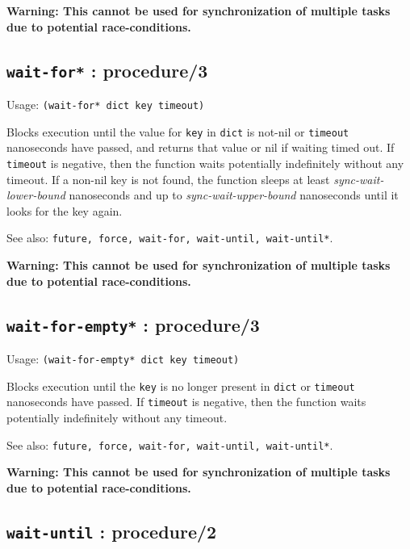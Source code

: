 \documentclass[
]{article}
\newcommand{\passthrough}[1]{#1}
\begin{document}
\textbf{Warning: This cannot be used for synchronization of multiple
tasks due to potential race-conditions.}

\hypertarget{wait-for-procedure3-1}{%
\subsection{\texorpdfstring{\texttt{wait-for*} :
procedure/3}{wait-for* : procedure/3}}\label{wait-for-procedure3-1}}

Usage: \passthrough{\lstinline!(wait-for* dict key timeout)!}

Blocks execution until the value for \passthrough{\lstinline!key!} in
\passthrough{\lstinline!dict!} is not-nil or
\passthrough{\lstinline!timeout!} nanoseconds have passed, and returns
that value or nil if waiting timed out. If
\passthrough{\lstinline!timeout!} is negative, then the function waits
potentially indefinitely without any timeout. If a non-nil key is not
found, the function sleeps at least \emph{sync-wait-lower-bound}
nanoseconds and up to \emph{sync-wait-upper-bound} nanoseconds until it
looks for the key again.

See also:
\passthrough{\lstinline!future, force, wait-for, wait-until, wait-until*!}.

\textbf{Warning: This cannot be used for synchronization of multiple
tasks due to potential race-conditions.}

\hypertarget{wait-for-empty-procedure3-1}{%
\subsection{\texorpdfstring{\texttt{wait-for-empty*} :
procedure/3}{wait-for-empty* : procedure/3}}\label{wait-for-empty-procedure3-1}}

Usage: \passthrough{\lstinline!(wait-for-empty* dict key timeout)!}

Blocks execution until the \passthrough{\lstinline!key!} is no longer
present in \passthrough{\lstinline!dict!} or
\passthrough{\lstinline!timeout!} nanoseconds have passed. If
\passthrough{\lstinline!timeout!} is negative, then the function waits
potentially indefinitely without any timeout.

See also:
\passthrough{\lstinline!future, force, wait-for, wait-until, wait-until*!}.

\textbf{Warning: This cannot be used for synchronization of multiple
tasks due to potential race-conditions.}

\hypertarget{wait-until-procedure2-1}{%
\subsection{\texorpdfstring{\texttt{wait-until} :
procedure/2}{wait-until : procedure/2}}\label{wait-until-procedure2-1}}
\end{document}
